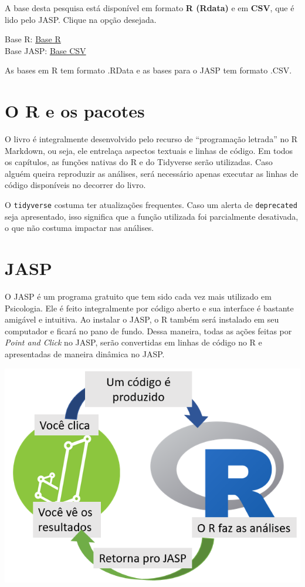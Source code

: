 \documentclass[
]{book}
\newenvironment{base}{
  \definecolor{shadecolor}{rgb}{0.972,0.972,0.972}  %
  \color{black}
  \begin{shaded}}
 {\end{shaded}}
\begin{document}
\begin{base}
A base desta pesquisa está disponível em formato \textbf{R (Rdata)} e em \textbf{CSV}, que é lido pelo JASP. Clique na opção desejada.

Base R: \href{}{Base R}\\
Base JASP: \href{}{Base CSV}

\end{base}

As bases em R tem formato .RData e as bases para o JASP tem formato .CSV.

\hypertarget{o-r-e-os-pacotes}{%
\section{O R e os pacotes}\label{o-r-e-os-pacotes}}

O livro é integralmente desenvolvido pelo recurso de ``programação letrada'' no R Markdown, ou seja, ele entrelaça aspectos textuais e linhas de código. Em todos os capítulos, as funções nativas do R e do Tidyverse serão utilizadas. Caso alguém queira reproduzir as análises, será necessário apenas executar as linhas de código disponíveis no decorrer do livro.

O \texttt{tidyverse} costuma ter atualizações frequentes. Caso um alerta de \texttt{deprecated} seja apresentado, isso significa que a função utilizada foi parcialmente desativada, o que não costuma impactar nas análises.

\hypertarget{jasp}{%
\section{JASP}\label{jasp}}

O JASP é um programa gratuito que tem sido cada vez mais utilizado em Psicologia. Ele é feito integralmente por código aberto e sua interface é bastante amigável e intuitiva. Ao instalar o JASP, o R também será instalado em seu computador e ficará no pano de fundo. Dessa maneira, todas as ações feitas por \emph{Point and Click} no JASP, serão convertidas em linhas de código no R e apresentadas de maneira dinâmica no JASP.

\includegraphics{./img/capa_r_jasp.png}
\end{document}
